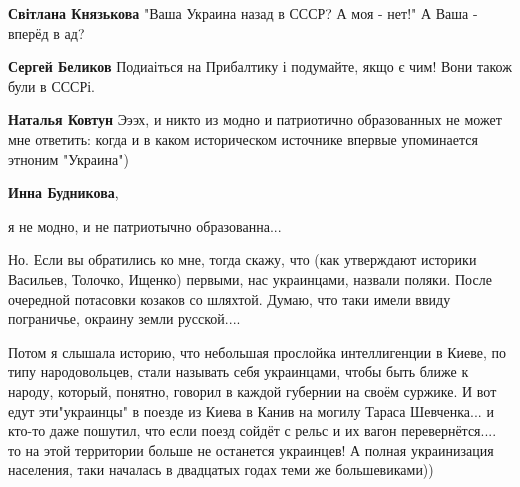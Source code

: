 \begin{itemize}
\begin{itemize}
\textbf{Світлана Князькова}
"Ваша Украина назад в СССР? А моя - нет!"
А Ваша - вперёд в ад?

 
\textbf{Сергей Беликов} Подиаіться на Прибалтику і подумайте, якщо є чим! Вони також були в СССРі.

 
\textbf{Наталья Ковтун} Эээх, и никто из модно и патриотично образованных не может мне ответить: когда и в каком историческом источнике впервые упоминается этноним "Украина")

 
\textbf{Инна Будникова}, 

я не модно, и не патриотычно образованна... 

Но. Если вы обратились ко мне, тогда скажу, что (как утверждают историки
Васильев, Толочко, Ищенко) первыми, нас украинцами, назвали поляки. После
очередной потасовки козаков со шляхтой. Думаю, что таки имели ввиду пограничье,
окраину земли русской.... 

Потом я слышала историю, что небольшая прослойка интеллигенции в Киеве, по типу
народовольцев, стали называть себя украинцами, чтобы быть ближе к народу,
который, понятно, говорил в каждой губернии на своём суржике. И вот едут
эти"украинцы" в поезде из Киева в Канив на могилу Тараса Шевченка... и кто-то
даже пошутил, что если поезд сойдёт с рельс и их вагон перевернётся.... то на
этой территории больше не останется украинцев! А полная украинизация населения,
таки началась в двадцатых годах теми же большевиками))

\end{itemize}

 


\end{itemize}

